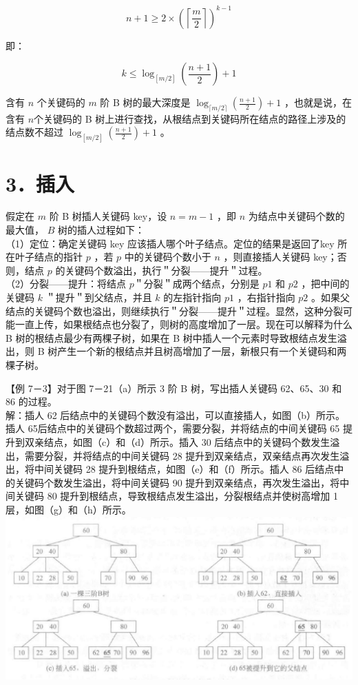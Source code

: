\documentclass[10pt]{article}
\begin{document}
$$
n+1 \geqslant 2 \times\left(\left\lceil\frac{m}{2}\right\rceil\right)^{k-1}
$$

即：

$$
k \leqslant \log _{[m / 2]}\left(\frac{n+1}{2}\right)+1
$$

含有 $n$ 个关键码的 $m$ 阶 B 树的最大深度是 $\log _{\lceil m / 2\rceil}\left(\frac{n+1}{2}\right)+1$ ，也就是说，在含有 $n$个关键码的 B 树上进行查找，从根结点到关键码所在结点的路径上涉及的结点数不超过 $\log _{[m / 2]}\left(\frac{n+1}{2}\right)+1$ 。

\section*{3．插入}
假定在 $m$ 阶 B 树插人关键码 key，设 $n=m-1$ ，即 $n$ 为结点中关键码个数的最大值， $B$ 树的插人过程如下：\\
（1）定位：确定关键码 key 应该插人哪个叶子结点。定位的结果是返回了key 所在叶子结点的指针 $p$ ，若 $p$ 中的关键码个数小于 $n$ ，则直接插人关键码 key；否则，结点 $p$ 的关键码个数溢出，执行＂分裂——提升＂过程。\\
（2）分裂——提升：将结点 $p$＂分裂＂成两个结点，分别是 $p 1$ 和 $p 2$ ，把中间的关键码 $k$ ＂提升＂到父结点，并且 $k$ 的左指针指向 $p 1$ ，右指针指向 $p 2$ 。如果父结点的关键码个数也溢出，则继续执行＂分裂——提升＂过程。显然，这种分裂可能一直上传，如果根结点也分裂了，则树的高度增加了一层。现在可以解释为什么 B 树的根结点最少有两棵子树，如果在 B 树中插人一个元素时导致根结点发生溢出，则 B 树产生一个新的根结点并且树高增加了一层，新根只有一个关键码和两棵子树。

【例 7－3】对于图 7－21（a）所示 3 阶 B 树，写出插人关键码 62、65、30 和 86 的过程。\\
解：插人 62 后结点中的关键码个数没有溢出，可以直接插人，如图（b）所示。插人 65后结点中的关键码个数超过两个，需要分裂，并将结点的中间关键码 65 提升到双亲结点，如图（c）和（d）所示。插入 30 后结点中的关键码个数发生溢出，需要分裂，并将结点的中间关键码 28 提升到双亲结点，双亲结点再次发生溢出，将中间关键码 28 提升到根结点，如图（e）和（f）所示。插人 86 后结点中的关键码个数发生溢出，将中间关键码 90 提升到双亲结点，再次发生溢出，将中间关键码 80 提升到根结点，导致根结点发生溢出，分裂根结点并使树高增加 1 层，如图（g）和（h）所示。\\
\includegraphics[max width=\textwidth, center]{2025_06_06_704745ea57b15b2333e5g-250}
\end{document}
